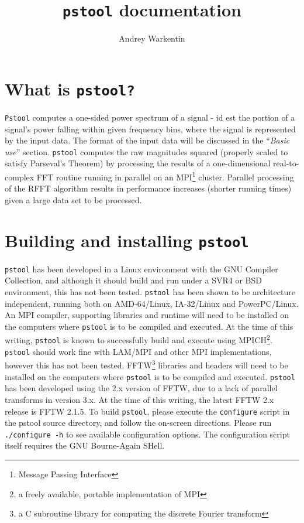\documentclass[12pt]{article}
\begin{document}
\title{\texttt{pstool} documentation}
\author{Andrey Warkentin}
\maketitle
  
\section{What is \texttt{pstool?}}
\texttt{Pstool} computes a one-sided power spectrum of a signal - id est the
portion of a signal's power falling within given frequency bins, where
the signal is represented by the input data. The format of the input
data will be discussed in the ``\emph{Basic use}''
section. \texttt{pstool} computes the raw magnitudes squared (properly
scaled to satisfy Parseval's Theorem) by processing the results of a
one-dimensional real-to-complex FFT routine running in parallel on an 
MPI\footnote{Message Passing Interface} cluster. Parallel processing 
of the RFFT algorithm results in performance increases (shorter
running times) given a large data set to be processed. 
\section{Building and installing \texttt{pstool}}
\texttt{pstool} has been developed in a Linux environment with the GNU
Compiler Collection, and although it should build and run under a SVR4 or BSD
environment, this has not been tested. \texttt{pstool} has been shown
to be architecture independent, running both on AMD-64/Linux,
IA-32/Linux and PowerPC/Linux. An MPI compiler, supporting
libraries and runtime will need to be 
installed on the computers where \texttt{pstool} is to be compiled and
executed. At the time of this writing, \texttt{pstool} is known to
successfully build and execute using MPICH\footnote{a freely available,
portable implementation of MPI}. \texttt{pstool} should work fine with
LAM/MPI and other MPI 
implementations, however this has not been tested. FFTW\footnote{a C subroutine
library for computing the discrete Fourier transform} libraries and
headers will need to be installed on the computers where
\texttt{pstool} is to be compiled and executed. \texttt{pstool} has
been developed using the 2.x version of FFTW, due to a lack of
parallel transforms in version 3.x. At the time of this writing, the
latest FFTW 2.x release is FFTW 2.1.5. To build \texttt{pstool},
please execute the \texttt{configure} script in the pstool source
directory, and follow the on-screen directions. Please run
\texttt{./configure -h} to see available configuration options. The
configuration script itself requires the GNU Bourne-Again SHell.
\end{document}
